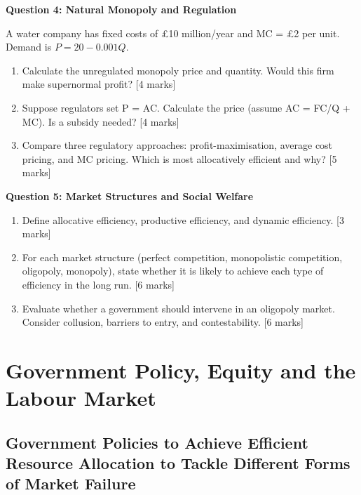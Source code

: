 \documentclass[11pt, a4paper, twoside]{book}
\begin{document}
\begin{exampractice}
\textbf{Question 4: Natural Monopoly and Regulation}

A water company has fixed costs of £10 million/year and MC = £2 per unit. Demand is $P = 20 - 0.001Q$.

\begin{enumerate}[label=(\alph*)]
\item Calculate the unregulated monopoly price and quantity. Would this firm make supernormal profit? [4 marks]
\item Suppose regulators set P = AC. Calculate the price (assume AC = FC/Q + MC). Is a subsidy needed? [4 marks]
\item Compare three regulatory approaches: profit-maximisation, average cost pricing, and MC pricing. Which is most allocatively efficient and why? [5 marks]
\end{enumerate}
\end{exampractice}

\begin{exampractice}
\textbf{Question 5: Market Structures and Social Welfare}

\begin{enumerate}[label=(\alph*)]
\item Define allocative efficiency, productive efficiency, and dynamic efficiency. [3 marks]
\item For each market structure (perfect competition, monopolistic competition, oligopoly, monopoly), state whether it is likely to achieve each type of efficiency in the long run. [6 marks]
\item Evaluate whether a government should intervene in an oligopoly market. Consider collusion, barriers to entry, and contestability. [6 marks]
\end{enumerate}
\end{exampractice}

\chapter{Government Policy, Equity and the Labour Market}

\section{Government Policies to Achieve Efficient Resource Allocation to Tackle Different Forms of Market Failure}
\end{document}
